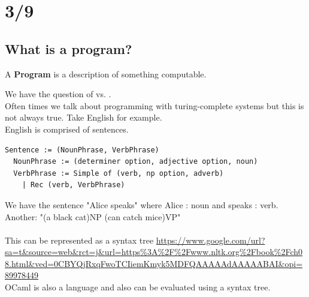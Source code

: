 \section{3/9}
\subsection{What is a program?}
\begin{definition}
  A \textbf{Program} is a description of something computable.
\end{definition}
We have the question of  vs. .
\\
Often times we talk about programming with turing-complete systems but this is not always true. Take English for example.
\\
English is comprised of sentences. 
\begin{lstlisting}
Sentence := (NounPhrase, VerbPhrase)
  NounPhrase := (determiner option, adjective option, noun)
  VerbPhrase := Simple of (verb, np option, adverb)
    | Rec (verb, VerbPhrase)
\end{lstlisting}
We have the sentence "Alice speaks" where Alice : noun and speaks : verb.
\\
Another: "(a black cat){NP} (can catch mice){VP}"
\\\\
This can be represented as a syntax tree \url{https://www.google.com/url?sa=t&source=web&rct=j&url=https%3A%2F%2Fwww.nltk.org%2Fbook%2Fch08.html&ved=0CBYQjRxqFwoTCIiemKmyk5MDFQAAAAAdAAAAABAI&opi=89978449}
\\
OCaml is also a language and also can be evaluated using a syntax tree.

